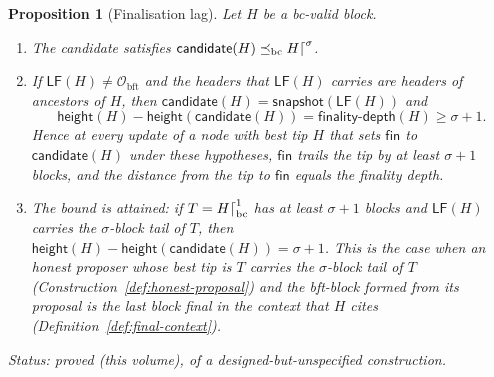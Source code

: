 \documentclass[11pt,a4paper]{article}
\newtheorem{proposition}[theorem]{Proposition}
\theoremstyle{definition}
\newcommand{\bc}{\mathrm{bc}}
\newcommand{\bft}{\mathrm{bft}}
\newcommand{\Origin}{\mathcal{O}}
\newcommand{\Obft}{\Origin_{\bft}}
\newcommand{\preceqbc}{\preceq_{\bc}}
\newcommand{\snapshot}{\mathsf{snapshot}}
\newcommand{\LF}{\mathsf{LF}}
\newcommand{\candidate}{\mathsf{candidate}}
\newcommand{\finalitydepth}{\mathsf{finality\text{-}depth}}
\newcommand{\fin}{\mathsf{fin}}
\begin{document}
\begin{proposition}[Finalisation lag]\label{prop:lag}
Let $H$ be a bc-valid block.
\begin{enumerate}[label=(\roman*)]
\item The candidate satisfies $\candidate(H) \preceqbc H\trunc{\sigma}$.
\item If $\LF(H) \neq \Obft$ and the headers that $\LF(H)$ carries are
  headers of ancestors of $H$, then $\candidate(H) = \snapshot(\LF(H))$ and
  \[
    \mathsf{height}(H) - \mathsf{height}(\candidate(H)) = \finalitydepth(H) \ge
    \sigma + 1.
  \]
  Hence at every update of a node with best tip $H$ that sets $\fin$ to
  $\candidate(H)$ under these hypotheses, $\fin$ trails the tip by at least
  $\sigma + 1$ blocks, and the distance from the tip to $\fin$ equals the
  finality depth.
\item The bound is attained: if $T = H\trunc[\bc]{1}$ has at least
  $\sigma + 1$ blocks and $\LF(H)$ carries the $\sigma$-block tail of $T$,
  then $\mathsf{height}(H) - \mathsf{height}(\candidate(H)) = \sigma + 1$. This
  is the case when an honest proposer whose best tip is $T$ carries the
  $\sigma$-block tail of $T$ (Construction~\ref{def:honest-proposal}) and the
  bft-block formed from its proposal is the last block final in the context that
  $H$ cites (Definition~\ref{def:final-context}).
\end{enumerate}

Status: proved (this volume), of a designed-but-unspecified construction.
\end{proposition}
\end{document}
